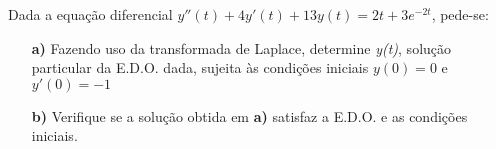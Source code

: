 \linespread{1.5}
Dada a equação diferencial $y''(t) + 4y'(t) + 13y(t) = 2t + 3e^{-2t}$, pede-se:
\begin{itemize}
    \item[\textbf{a)}] Fazendo uso da transformada de Laplace, determine \textit{y(t)}, solução particular da E.D.O. dada, sujeita às condições iniciais $y(0) = 0$ e $y'(0) = -1$
    \item[\textbf{b)}] Verifique se a solução obtida em \textbf{a)} satisfaz a E.D.O. e as condições iniciais.
\end{itemize}